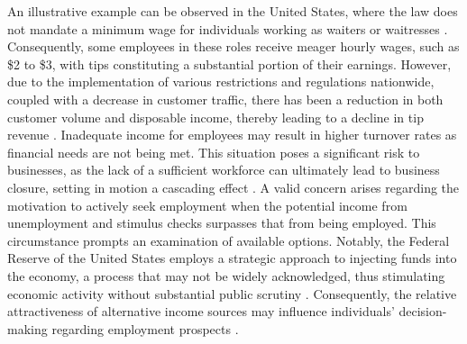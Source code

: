 An illustrative example can be observed in the United States, where the law does not mandate a minimum wage for individuals working as waiters or waitresses \cite{dol}. Consequently, some employees in these roles receive meager hourly wages, such as \$2 to \$3, with tips constituting a substantial portion of their earnings. However, due to the implementation of various restrictions and regulations nationwide, coupled with a decrease in customer traffic, there has been a reduction in both customer volume and disposable income, thereby leading to a decline in tip revenue \cite{bls2022}. Inadequate income for employees may result in higher turnover rates as financial needs are not being met. This situation poses a significant risk to businesses, as the lack of a sufficient workforce can ultimately lead to business closure, setting in motion a cascading effect \cite{azar2020}. A valid concern arises regarding the motivation to actively seek employment when the potential income from unemployment and stimulus checks surpasses that from being employed. This circumstance prompts an examination of available options. Notably, the Federal Reserve of the United States employs a strategic approach to injecting funds into the economy, a process that may not be widely acknowledged, thus stimulating economic activity without substantial public scrutiny \cite{frb}. Consequently, the relative attractiveness of alternative income sources may influence individuals' decision-making regarding employment prospects \cite{cbo2021}.


